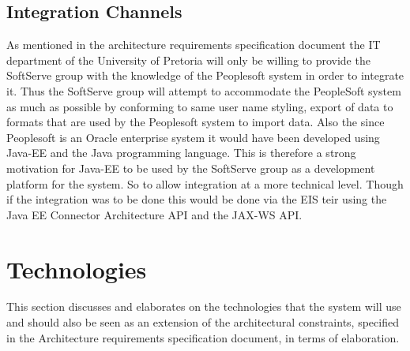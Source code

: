 \documentclass[12pt]{article}
\begin{document}
\subsection{Integration Channels}
As mentioned in the architecture requirements specification document the IT department of the University of Pretoria will only be willing to provide the SoftServe group with the knowledge of the Peoplesoft system in order to integrate it. Thus the SoftServe group will attempt to accommodate the PeopleSoft system as much as possible by conforming to same user name styling, export of data to formats that are used by the Peoplesoft system to import data. Also the since Peoplesoft is an Oracle enterprise system it would have been developed using Java-EE and the Java programming language. This is therefore a strong motivation for Java-EE to be used by the SoftServe group as a development platform for the system. So to allow integration at a more technical level. Though if the integration was to be done this would be done via the EIS teir using the Java EE Connector Architecture API and the JAX-WS API.  





\section{Technologies}
This section discusses and elaborates on the technologies that the system will use and should also be seen as an extension of the architectural constraints, specified in the Architecture requirements specification document, in terms of elaboration.
\end{document}
